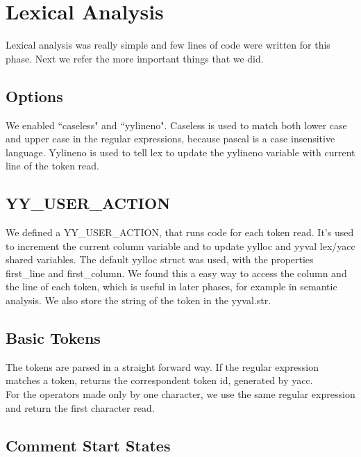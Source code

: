 \documentclass[12pt]{article}
\begin{document}
\newpage

\section{Lexical Analysis}

Lexical analysis was really simple and few lines of code were written for this phase. Next we refer the more important things that we did.\\

\subsection{Options}

We enabled ``caseless" and ``yylineno". Caseless is used to match both lower case and upper case in the regular expressions, because pascal is a case insensitive language. Yylineno is used to tell lex to update the yylineno variable with current line of the token read.

\subsection{YY\_USER\_ACTION}

We defined a YY\_USER\_ACTION, that runs code for each token read. It's used to increment the current column variable and to update yylloc and yyval lex/yacc shared variables. The default yylloc struct was used, with the properties first\_line and first\_column. We found this a easy way to access the column and the line of each token, which is useful in later phases, for example in semantic analysis. We also store the string of the token in the yyval.str.\\

\subsection{Basic Tokens}

The tokens are parsed in a straight forward way. If the regular expression matches a token, returns the correspondent token id, generated by yacc.\\ For the operators made only by one character, we use the same regular expression and return the first character read.\\

\subsection{Comment Start States}
\end{document}
